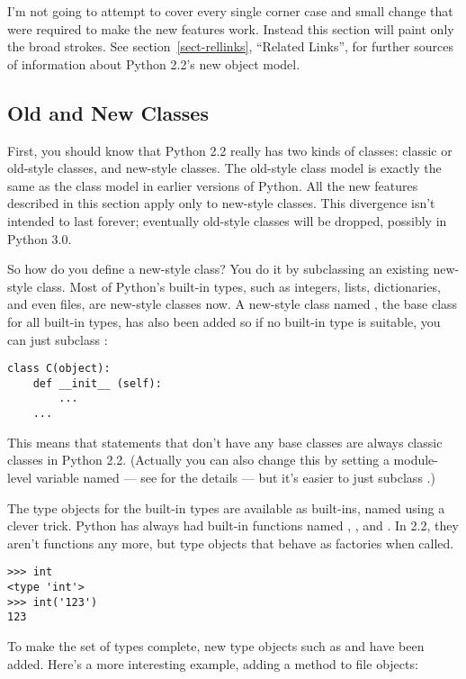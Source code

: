 \documentclass{howto}
\begin{document}
I'm not going to attempt to cover every single corner case and small
change that were required to make the new features work.  Instead this
section will paint only the broad strokes.  See section~\ref{sect-rellinks},
``Related Links'', for further sources of information about Python 2.2's new
object model.


\subsection{Old and New Classes}

First, you should know that Python 2.2 really has two kinds of
classes: classic or old-style classes, and new-style classes.  The
old-style class model is exactly the same as the class model in
earlier versions of Python.  All the new features described in this
section apply only to new-style classes. This divergence isn't
intended to last forever; eventually old-style classes will be
dropped, possibly in Python 3.0.

So how do you define a new-style class?  You do it by subclassing an
existing new-style class.  Most of Python's built-in types, such as
integers, lists, dictionaries, and even files, are new-style classes
now.  A new-style class named , the base class for all
built-in types, has also been added so if no built-in type is
suitable, you can just subclass :

\begin{verbatim}
class C(object):
    def __init__ (self):
        ...
    ...
\end{verbatim}

This means that  statements that don't have any base
classes are always classic classes in Python 2.2.  (Actually you can
also change this by setting a module-level variable named
 --- see  for the details --- but it's
easier to just subclass .)

The type objects for the built-in types are available as built-ins,
named using a clever trick.  Python has always had built-in functions
named , , and .  In
2.2, they aren't functions any more, but type objects that behave as
factories when called.

\begin{verbatim}
>>> int
<type 'int'>
>>> int('123')
123
\end{verbatim}

To make the set of types complete, new type objects such as
 and  have been added.  Here's a
more interesting example, adding a  method to file
objects:
\end{document}

